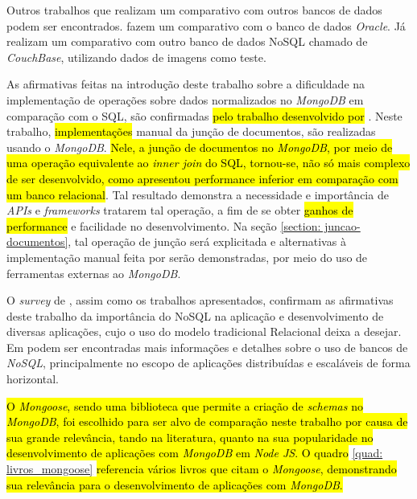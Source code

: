 Outros trabalhos que realizam um comparativo com outros bancos de dados podem ser encontrados.  fazem um comparativo com o banco de dados \textit{Oracle}. Já  realizam um comparativo com outro banco de dados NoSQL chamado de \textit{CouchBase}, utilizando dados de imagens como teste.

As afirmativas feitas na introdução deste trabalho sobre a dificuldade na implementação de operações sobre dados normalizados no \textit{MongoDB} em comparação com o SQL, são confirmadas \hl{pelo trabalho desenvolvido por} . Neste trabalho, \hl{implementações} manual da junção de documentos, são realizadas usando o \textit{MongoDB}. \hl{Nele, a junção de documentos no \textit{MongoDB}, por meio de uma operação equivalente ao \textit{inner join} do SQL, tornou-se, não só mais complexo de ser desenvolvido, como apresentou performance inferior em comparação com um banco relacional}. Tal resultado demonstra a necessidade e importância de \textit{APIs} e \textit{frameworks} tratarem tal operação, a fim de se obter \hl{ganhos de performance} e facilidade no desenvolvimento. Na seção \ref{section: juncao-documentos}, tal operação de junção será explicitada e alternativas à implementação manual feita por  serão demonstradas, por meio do uso de ferramentas externas ao \textit{MongoDB}.

O \textit{survey} de , assim como os trabalhos apresentados, confirmam as afirmativas deste trabalho da importância do NoSQL na aplicação e desenvolvimento de diversas aplicações, cujo o uso do modelo tradicional Relacional deixa a desejar. Em  podem ser encontradas mais informações e detalhes sobre o uso de bancos de \textit{NoSQL}, principalmente no escopo de aplicações distribuídas e escaláveis de forma horizontal.

\hl{O \textit{Mongoose}, sendo uma biblioteca que permite a criação de \textit{schemas} no \textit{MongoDB}, foi escolhido para ser alvo de comparação neste trabalho por causa de sua grande relevância, tando na literatura, quanto na sua popularidade no desenvolvimento de aplicações com \textit{MongoDB} em \textit{Node JS}. O quadro} \ref{quad: livros_mongoose} \hl{referencia vários livros que citam o \textit{Mongoose}, demonstrando sua relevância para o desenvolvimento de aplicações com \textit{MongoDB}.}

